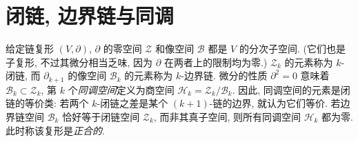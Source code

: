 \section{{闭链, 边界链与同调}}\label{sec:cycles-boundaries-homology}

{给定链复形 $(V,\partial)$, $\partial$ 的零空间 $\mathcal Z$ 和像空间 $\mathcal B$ 都是 $V$ 的分次子空间. (它们也是子复形, 不过其微分相当乏味, 因为 $\partial$ 在两者上的限制均为零.) $\mathcal Z_k$ 的元素称为 $k$-闭链, 而 $\partial_{k+1}$ 的像空间 $\mathcal B_k$ 的元素称为 $k$-边界链. 微分的性质 $\partial^2=0$ 意味着 $\mathcal B_k\subset\mathcal Z_k$, 第 $k$ 个\emph{同调空间}定义为商空间 $\mathcal H_k=\mathcal Z_k/\mathcal B_k$. 因此, 同调空间的元素是闭链的等价类: 若两个 $k$-闭链之差是某个 $(k+1)$-链的边界, 就认为它们等价. 若边界链空间 $\mathcal B_k$ 恰好等于闭链空间 $\mathcal Z_k$, 而非其真子空间, 则所有同调空间 $\mathcal H_k$ 都为零. 此时称该复形是\emph{正合的}.}
